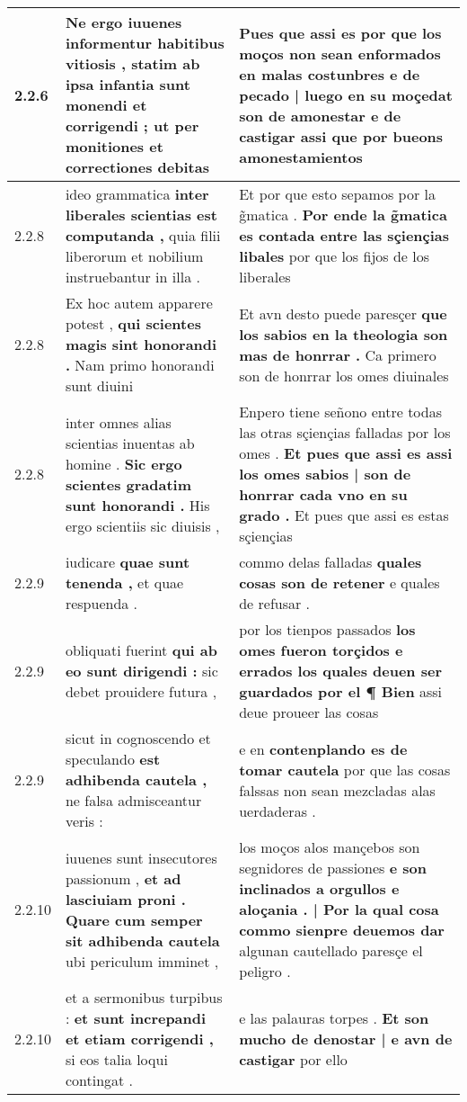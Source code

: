 \begin{tabular}{|p{1cm}|p{6.5cm}|p{6.5cm}|}
2.2.6 & Ne ergo iuuenes informentur habitibus vitiosis , \textbf{ statim ab ipsa infantia sunt monendi et corrigendi ; } ut per monitiones et correctiones debitas & Pues que assi es por que los moços non sean enformados en malas costunbres \textbf{ e de pecado | luego en su moçedat son de amonestar e de castigar } assi que por bueons amonestamientos \\\hline
2.2.8 & ideo grammatica \textbf{ inter liberales scientias est computanda , } quia filii liberorum et nobilium instruebantur in illa . & Et por que esto sepamos por la g̃matica . \textbf{ Por ende la g̃matica es contada entre las sçiençias libales } por que los fijos de los liberales \\\hline
2.2.8 & Ex hoc autem apparere potest , \textbf{ qui scientes magis sint honorandi . } Nam primo honorandi sunt diuini & Et avn desto puede paresçer \textbf{ que los sabios en la theologia son mas de honrrar . } Ca primero son de honrrar los omes diuinales \\\hline
2.2.8 & inter omnes alias scientias inuentas ab homine . \textbf{ Sic ergo scientes gradatim sunt honorandi . } His ergo scientiis sic diuisis , & Enpero tiene señono entre todas las otras sçiençias falladas por los omes . \textbf{ Et pues que assi es assi los omes sabios | son de honrrar cada vno en su grado . } Et pues que assi es estas sçiençias \\\hline
2.2.9 & iudicare \textbf{ quae sunt tenenda , } et quae respuenda . & commo delas falladas \textbf{ quales cosas son de retener } e quales de refusar . \\\hline
2.2.9 & obliquati fuerint \textbf{ qui ab eo sunt dirigendi : } sic debet prouidere futura , & por los tienpos passados \textbf{ los omes fueron torçidos e errados los quales deuen ser guardados por el ¶ Bien } assi deue proueer las cosas \\\hline
2.2.9 & sicut in cognoscendo et speculando \textbf{ est adhibenda cautela , } ne falsa admisceantur veris : & e en \textbf{ contenplando es de tomar cautela } por que las cosas falssas non sean mezcladas alas uerdaderas . \\\hline
2.2.10 & iuuenes sunt insecutores passionum , \textbf{ et ad lasciuiam proni . Quare cum semper sit adhibenda cautela } ubi periculum imminet , & los moços alos mançebos son segnidores de passiones \textbf{ e son inclinados a orgullos e aloçania . | Por la qual cosa commo sienpre deuemos dar } algunan cautellado paresçe el peligro . \\\hline
2.2.10 & et a sermonibus turpibus : \textbf{ et sunt increpandi et etiam corrigendi , } si eos talia loqui contingat . & e las palauras torpes . \textbf{ Et son mucho de denostar | e avn de castigar } por ello \\\hline

\end{tabular}
